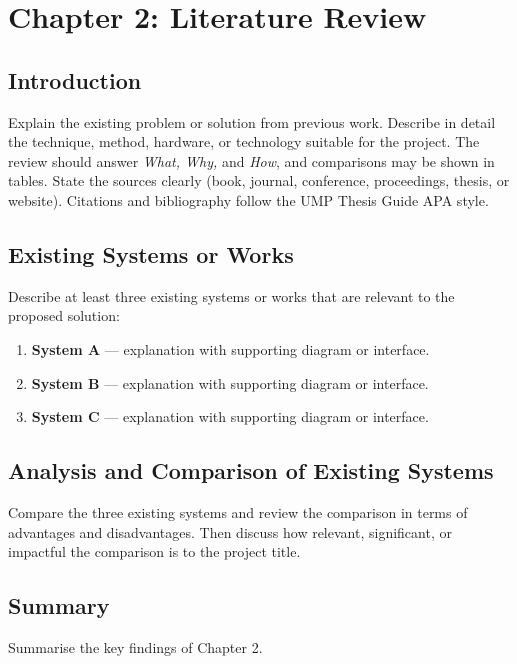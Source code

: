 \section{Chapter 2: Literature Review}

\subsection{Introduction}

Explain the existing problem or solution from previous work. Describe in detail the technique, method, hardware, or technology suitable for the project. The review should answer \emph{What, Why,} and \emph{How}, and comparisons may be shown in tables. State the sources clearly (book, journal, conference, proceedings, thesis, or website). Citations and bibliography follow the UMP Thesis Guide APA style.

\subsection{Existing Systems or Works}

Describe at least three existing systems or works that are relevant to the proposed solution:

\begin{enumerate}
    \item \textbf{System A} --- explanation with supporting diagram or interface.
    \item \textbf{System B} --- explanation with supporting diagram or interface.
    \item \textbf{System C} --- explanation with supporting diagram or interface.
\end{enumerate}

\subsection{Analysis and Comparison of Existing Systems}

Compare the three existing systems and review the comparison in terms of advantages and disadvantages. Then discuss how relevant, significant, or impactful the comparison is to the project title.

\subsection{Summary}

Summarise the key findings of Chapter 2.

